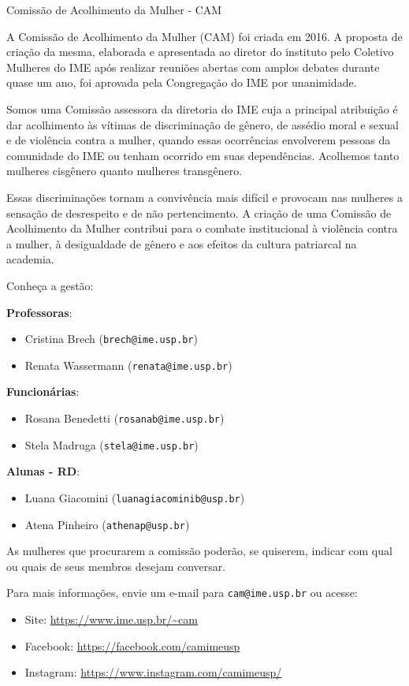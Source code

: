 \begin{subsecao}{Comissão de Acolhimento da Mulher - CAM}

A Comissão de Acolhimento da Mulher (CAM) foi criada em 2016. A proposta de 
criação da mesma, elaborada e apresentada ao diretor do instituto pelo 
Coletivo Mulheres do IME após realizar reuniões abertas com amplos debates 
durante quase um ano, foi aprovada pela Congregação do IME por unanimidade.

Somos uma Comissão assessora da diretoria do IME cuja a principal atribuição 
é dar acolhimento às vítimas de discriminação de gênero, de assédio moral e 
sexual e de violência contra a mulher, quando essas ocorrências envolverem 
pessoas da comunidade do IME ou tenham ocorrido em suas dependências. Acolhemos
tanto mulheres cisgênero quanto mulheres transgênero.

Essas discriminações tornam a convivência mais difícil e provocam nas mulheres
a sensação de desrespeito e de não pertencimento. A criação de uma Comissão de 
Acolhimento da Mulher contribui para o combate institucional à violência contra
a mulher, à desigualdade de gênero e aos efeitos da cultura patriarcal na academia.

Conheça a gestão: 

\textbf{Professoras}: 
\vspace{-15pt}
\begin{itemize}
  \item Cristina Brech ({\tt brech@ime.usp.br})
  \item Renata Wassermann ({\tt renata@ime.usp.br})
\end{itemize}

\textbf{Funcionárias}: 
\vspace{-15pt}
\begin{itemize}
  \item Rosana Benedetti ({\tt rosanab@ime.usp.br})
  \item Stela Madruga ({\tt stela@ime.usp.br})
\end{itemize}

\textbf{Alunas - RD}: 
\vspace{-15pt}
\begin{itemize}
  \item Luana Giacomini ({\tt luanagiacominib@usp.br})
  \item Atena Pinheiro ({\tt athenap@usp.br})
\end{itemize}

As mulheres que procurarem a comissão poderão, se quiserem, indicar com qual ou 
quais de seus membros desejam conversar.

Para mais informações, envie um e-mail para {\tt cam@ime.usp.br} ou acesse:
\begin{itemize}
  \item Site: \url{https://www.ime.usp.br/~cam}
  \item Facebook: \url{https://facebook.com/camimeusp}
  \item Instagram: \url{https://www.instagram.com/camimeusp/}
\end{itemize}


\end{subsecao}
